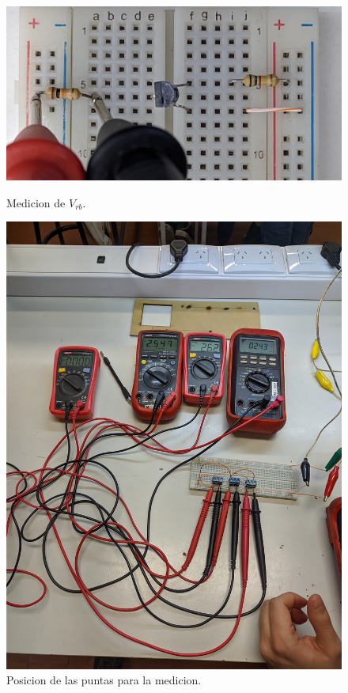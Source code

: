 \begin{figure}[!ht]
        \begin{center}
         \begin{minipage}{0.5\textwidth}
        
            \includegraphics[width=1\textwidth]{tp3/pictures/prot_crkt-1_Vrb.jpg}
            \caption{Medicion de $V_{rb}$.}

        \end{minipage}    

        \begin{minipage}{0.25\textwidth}
        
            \includegraphics[width=1\textwidth]{tp3/pictures/setup_crkt-1.jpg}
            \caption{Posicion de las puntas para la medicion.}


\end{minipage}
\end{center}
\end{figure}
